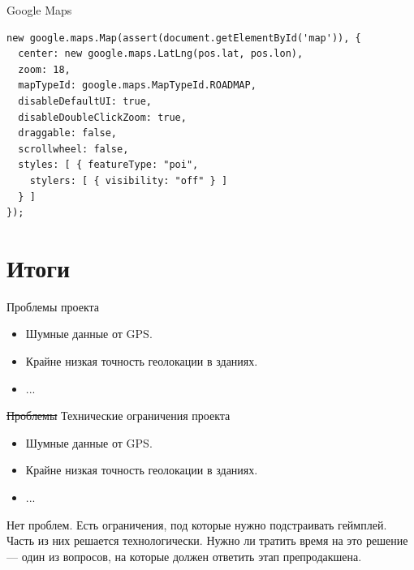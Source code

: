 \documentclass[aspectratio=169,handout,bigger]{beamer}
\newcommand{\soutt}[1]{%
    \renewcommand{\ULthickness}{1pt}%
       \sout{#1}%
    \renewcommand{\ULthickness}{.4pt}%
}
\begin{document}

\begin{frame}[fragile]{Google Maps}
\begin{verbatim}
new google.maps.Map(assert(document.getElementById('map')), {
  center: new google.maps.LatLng(pos.lat, pos.lon),
  zoom: 18,
  mapTypeId: google.maps.MapTypeId.ROADMAP,
  disableDefaultUI: true,
  disableDoubleClickZoom: true,
  draggable: false,
  scrollwheel: false,
  styles: [ { featureType: "poi",
    stylers: [ { visibility: "off" } ]
  } ]
});
\end{verbatim}
\end{frame}


\section{Итоги}


\begin{frame}{Проблемы проекта}
  \begin{itemize}
    \item Шумные данные от GPS.
    \item Крайне низкая точность геолокации в зданиях.
    \item ...
  \end{itemize}
\end{frame}


\begin{frame}{\soutt{Проблемы} Технические ограничения проекта}
  \begin{itemize}
    \item Шумные данные от GPS.
    \item Крайне низкая точность геолокации в зданиях.
    \item ...
  \end{itemize}

  Нет проблем. Есть ограничения, под которые нужно подстраивать геймплей.
  Часть из них решается технологически. Нужно ли тратить время на это решение
  --- один из вопросов, на которые должен ответить этап препродакшена.
\end{frame}
\end{document}
